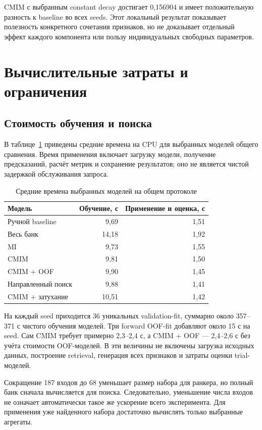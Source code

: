 \documentclass[12pt,a4paper]{article}
\begin{document}
CMIM с выбранным constant decay достигает 0,156904 и имеет положительную
разность к baseline во всех seeds. Этот локальный результат показывает
полезность конкретного сочетания признаков, но не доказывает отдельный
эффект каждого компонента или пользу индивидуальных свободных параметров.

\section{Вычислительные затраты и ограничения}
\subsection{Стоимость обучения и поиска}
В таблице~\ref{tab:cost} приведены средние времена на CPU для выбранных
моделей общего сравнения. Время применения включает загрузку модели,
получение предсказаний, расчёт метрик и сохранение результатов;
оно не является чистой задержкой обслуживания запроса.
\begin{table}[H]
\centering
\small
\caption{Средние времена выбранных моделей на общем протоколе}\label{tab:cost}
\begin{tabular}{lrr}\toprule
Модель & Обучение, с & Применение и оценка, с \\ \midrule
Ручной baseline & 9,69 & 1,51 \\
Весь банк & 14,18 & 1,92 \\
MI & 9,73 & 1,55 \\
CMIM & 9,81 & 1,50 \\
CMIM + OOF & 9,90 & 1,45 \\
Направленный поиск & 9,88 & 1,41 \\
CMIM + затухание & 10,51 & 1,42 \\
\bottomrule
\end{tabular}
\end{table}
На каждый seed приходится 36 уникальных validation-fit,
суммарно около 357–371 с чистого обучения моделей. Три forward OOF-fit
добавляют около 15 с на seed. Сам CMIM требует примерно 2,3–2,4 с,
а CMIM + OOF — 2,4–2,6 с без учёта стоимости OOF-моделей.
В эти величины не включены загрузка исходных данных, построение
retrieval, генерация всех признаков и затраты оценки trial-моделей.

Сокращение 187 входов до 68 уменьшает размер набора для ранкера,
но полный банк сначала вычисляется для поиска. Следовательно,
уменьшение числа входов не означает автоматически такое же ускорение
всего эксперимента. Для применения уже найденного набора достаточно
вычислять только выбранные агрегаты.
\end{document}

